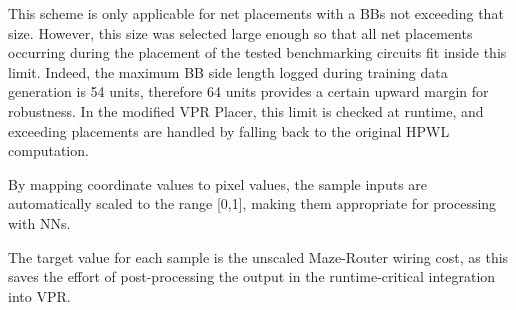 This scheme is only applicable for net placements with a \glspl{BB} not exceeding that size. However, this size was selected large enough so that all net placements occurring during the placement of the tested benchmarking circuits fit inside this limit. Indeed, the maximum \gls{BB} side length logged during training data generation is 54 units, therefore 64 units provides a certain upward margin for robustness. In the modified \gls{VPR} Placer, this limit is checked at runtime, and exceeding placements are handled by falling back to the original \gls{HPWL} computation.

By mapping coordinate values to pixel values, the sample inputs are automatically scaled to the range [0,1], making them appropriate for processing with \glspl{NN}.

The target value for each sample is the unscaled Maze-Router wiring cost, as this saves the effort of post-processing the output in the runtime-critical integration into \gls{VPR}.

\pagebreak

